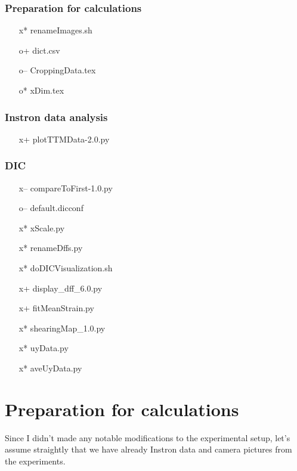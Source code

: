 \documentclass[a4paper]{article}
\begin{document}
\subsubsection{Preparation for calculations}

\begin{itemize}  
\item[x*] renameImages.sh
\item[o+] dict.csv
\item[o--] CroppingData.tex
\item[o*] xDim.tex
\end{itemize}

\subsubsection{Instron data analysis}

\begin{itemize}
\item[x+] plotTTMData-2.0.py
\end{itemize}

\subsubsection{DIC}

\begin{itemize}
\item[x--] compareToFirst-1.0.py 
\item[o--] default.dicconf
\item[x*] xScale.py
\item[x*] renameDffs.py
\item[x*] doDICVisualization.sh
\item[x+] display\_dff\_6.0.py
\item[x+] fitMeanStrain.py
\item[x*] shearingMap\_1.0.py
\item[x*] uyData.py
\item[x*] aveUyData.py
\end{itemize}

\section{Preparation for calculations}

Since I didn't made any notable modifications to the experimental setup, 
let's assume straightly that we have already Instron data and camera 
pictures from the experiments. 
\end{document}
